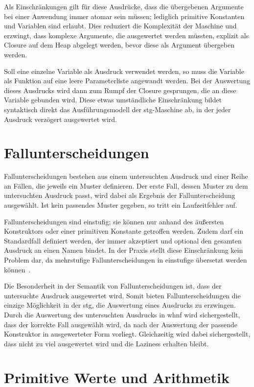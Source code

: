 Als Einschränkungen gilt für diese Ausdrücke, dass die übergebenen Argumente bei einer Anwendung immer atomar sein müssen; lediglich primitive Konstanten und Variablen sind erlaubt.
Dies reduziert die Komplexität der Maschine und erzwingt, dass komplexe Argumente, die ausgewertet werden müssten, explizit als Closure auf dem Heap abgelegt werden, bevor diese als Argument übergeben werden.

Soll eine einzelne Variable als Ausdruck verwendet werden, so muss die Variable als Funktion auf eine leere Parameterliste angewandt werden.
Bei der Auswertung dieses Ausdrucks wird dann zum Rumpf der Closure gesprungen, die an diese Variable gebunden wird.
Diese etwas umständliche Einschränkung bildet syntaktisch direkt das Ausführungsmodell der \gls{stg}-Maschine ab, in der jeder Ausdruck verzögert ausgewertet wird.

\section{Fallunterscheidungen}

Fallunterscheidungen bestehen aus einem untersuchten Ausdruck und einer Reihe an Fällen, die jeweils ein Muster definieren.
Der erste Fall, dessen Muster zu dem untersuchten Ausdruck passt, wird dabei als Ergebnis der Fallunterscheidung ausgewählt.
Ist kein passendes Muster gegeben, so tritt ein Laufzeitfehler auf.

Fallunterscheidungen sind einstufig; sie können nur anhand des äußersten Konstruktors oder einer primitiven Konstante getroffen werden.
Zudem darf ein Standardfall definiert werden, der immer akzeptiert und optional den gesamten Ausdruck an einen Namen bindet.
In der Praxis stellt diese Einschränkung kein Problem dar, da mehrstufige Fallunterscheidungen in einstufige übersetzt werden können~\cite{Wadler_PatternMatching}.

Die Besonderheit in der Semantik von Fallunterscheidungen ist, dass der untersuchte Ausdruck ausgewertet wird.
Somit bieten Fallunterscheidungen die einzige Möglichkeit in der \gls{stg}, die Auswertung eines Ausdrucks zu erzwingen.
Durch die Auswertung des untersuchten Ausdrucks in \gls{whnf} wird sichergestellt, dass der korrekte Fall ausgewählt wird, da nach der Auswertung der passende Konstruktor in ausgewerteter Form vorliegt.
Gleichzeitig wird dabei sichergestellt, dass nicht zu viel ausgewertet wird und die Laziness erhalten bleibt.


\section{Primitive Werte und Arithmetik}

